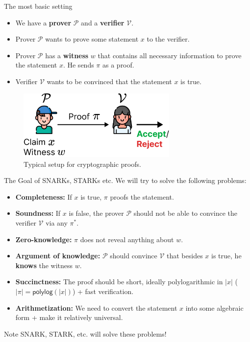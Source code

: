 \documentclass{zkdl-presentation-template}
\begin{document}
    \begin{frame}{The most basic setting}
        \begin{itemize}
            \item We have a \textbf{prover} $\mathcal{P}$ and a \textbf{verifier} $\mathcal{V}$.
            \item Prover $\mathcal{P}$ wants to prove some statement $x$ to the verifier.
            \item Prover $\mathcal{P}$ has a \textbf{witness} $w$ that contains all necessary information to prove the statement $x$. He sends $\pi$ as a proof.
            \item Verifier $\mathcal{V}$ wants to be convinced that the statement $x$ is true.
        \end{itemize}

        \begin{figure}
            \centering
            \includegraphics[width=0.7\textwidth]{images/lecture_6/setup.pdf}
            \caption{Typical setup for cryptographic proofs.}
        \end{figure}
    \end{frame}

    \begin{frame}{The Goal of SNARKs, STARKs etc.}
        We will try to solve the following problems:
        \begin{itemize}
            \item \textbf{Completeness:} If $x$ is true, $\pi$ proofs the statement.
            \item \textbf{Soundness:} If $x$ is false, the prover $\mathcal{P}$ should not be able to convince the verifier $\mathcal{V}$ via any $\pi^*$.
            \item \textbf{Zero-knowledge:} $\pi$ does not reveal anything about $w$.
            \item \textbf{Argument of knowledge:} $\mathcal{P}$ should convince $\mathcal{V}$ that besides $x$ is true, he \textbf{knows} the witness $w$.
            \item \textbf{Succinctness:} The proof should be short, ideally polylogarithmic in $|x|$ ($|\pi| = \mathsf{polylog}(|x|)$) + fast verification.
            \item \textbf{Arithmetization:} We need to convert the statement $x$ into some algebraic form + make it relatively universal.
        \end{itemize}

        \begin{alertblock}{Note}
            SNARK, STARK, etc. will solve these problems!
        \end{alertblock}
    \end{frame}
\end{document}
